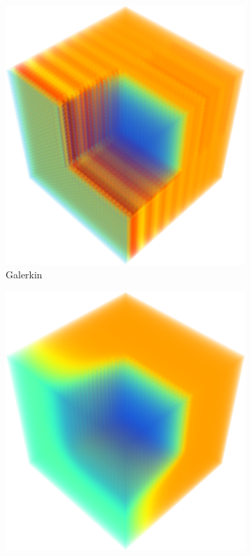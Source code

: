 \begin{figure}[h]
   \centering
   \begin{subfigure}{0.45\textwidth}
      \includegraphics[width=\textwidth]{void_to_absorber/Gal_3D.png}
      \caption{Galerkin}
   \end{subfigure}
   \begin{subfigure}{0.45\textwidth}
      \includegraphics[width=\textwidth]{void_to_absorber/GalFCT_3D.png}

\end{subfigure}
\end{figure}
